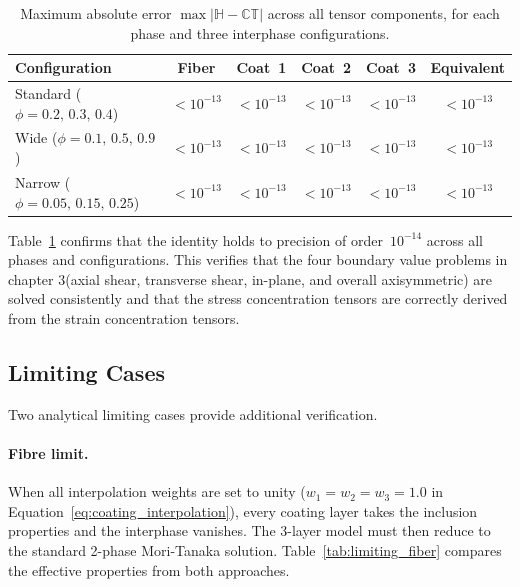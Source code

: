 \documentclass[oneside, 12pt, a4paper, bibliography=totoc]{book}
\newcommand{\tens}[1]{\mathbb{#1}}                 %
\begin{document}
\begin{table}[htbp]
\centering
\caption{Maximum absolute error $\max|\tens{H} - \tens{C}\tens{T}|$ across all tensor components, for each phase and three interphase configurations.}
\label{tab:hct_verification}
\begin{tabular}{lccccc}
\toprule
Configuration & Fiber & Coat~1 & Coat~2 & Coat~3 & Equivalent \\
\midrule
Standard ($\phi = 0.2,\, 0.3,\, 0.4$) & $< 10^{-13}$ & $< 10^{-13}$ & $< 10^{-13}$ & $< 10^{-13}$ & $< 10^{-13}$ \\
Wide ($\phi = 0.1,\, 0.5,\, 0.9$) & $< 10^{-13}$ & $< 10^{-13}$ & $< 10^{-13}$ & $< 10^{-13}$ & $< 10^{-13}$ \\
Narrow ($\phi = 0.05,\, 0.15,\, 0.25$) & $< 10^{-13}$ & $< 10^{-13}$ & $< 10^{-13}$ & $< 10^{-13}$ & $< 10^{-13}$ \\
\bottomrule
\end{tabular}
\end{table}

Table~\ref{tab:hct_verification} confirms that the identity holds to precision of order~$10^{-14}$ across all phases and configurations. This verifies that the four boundary value problems in chapter 3(axial shear, transverse shear, in-plane, and overall axisymmetric) are solved consistently and that the stress concentration tensors are correctly derived from the strain concentration tensors.

\subsection{Limiting Cases}
\label{subsec:limiting_cases}

Two analytical limiting cases provide additional verification.

\paragraph{Fibre limit.}
When all interpolation weights are set to unity ($w_1 = w_2 = w_3 = 1.0$ in Equation~\eqref{eq:coating_interpolation}), every coating layer takes the inclusion properties and the interphase vanishes. The 3-layer model must then reduce to the standard 2-phase Mori-Tanaka solution. Table~\ref{tab:limiting_fiber} compares the effective properties from both approaches.
\end{document}

